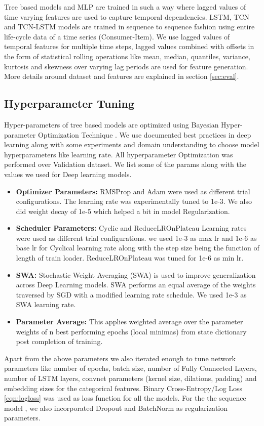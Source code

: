 Tree based models and MLP are trained in such a way where lagged values of time varying features are used
to capture temporal dependencies. LSTM, TCN and TCN-LSTM models are trained in sequence to sequence 
fashion \cite{sutskever2014sequence} using entire life-cycle data of a time series (Consumer-Item).
We use lagged values of temporal features for multiple time steps, lagged values combined with offsets in the form 
of statistical rolling operations like mean, median, quantiles, variance, 
kurtosis and skewness over varying lag periods are used for feature generation. More details around dataset and features 
are explained in section \ref{sec:eval}. 

\subsection{Hyperparameter Tuning}
Hyper-parameters of tree based models are optimized
using Bayesian Hyper-parameter Optimization Technique \cite{bergstra2013hyperopt}. We use documented best practices in deep 
learning along with some experiments and domain understanding to choose model hyperparameters like learning rate.
All hyperparameter Optimization was performed over Validation dataset. 
We list some of the params along with the values we used for Deep learning models.
  \begin{itemize}
    \item {\bf Optimizer Parameters:} RMSProp \cite{bengio2015rmsprop} and Adam were used as different trial configurations. The learning rate 
    was experimentally tuned to 1e-3. We also did weight decay of 1e-5 which helped a bit in model Regularization.
    \item {\bf Scheduler Parameters:} Cyclic \cite{smith2017cyclical} and ReduceLROnPlateau \cite{zaheer2018adaptive} 
    Learning rates were used as different trial configurations.
    we used 1e-3 as max lr and 1e-6 as base lr for Cyclical learning rate along with the step size being the function of
    length of train loader. ReduceLROnPlateau was tuned for 1e-6 as min lr.
    \item {\bf SWA:} Stochastic Weight Averaging (SWA) \cite{izmailov2018averaging} is used to improve generalization across Deep Learning
    models. SWA performs an equal average of the weights traversed by SGD with a modified learning rate schedule. We used 
    1e-3 as SWA learning rate.
    \item {\bf Parameter Average:} This applies weighted average over the parameter weights of n best performing epochs 
    (local minimas) from state dictionary post completion of training.
  \end{itemize}
Apart from the above parameters we also iterated enough to tune network parameters like number of epochs, batch size, 
number of Fully Connected Layers, number of LSTM layers, convnet parameters (kernel size, dilations, padding)
and embedding sizes for the categorical features. Binary Cross-Entropy/Log Loss \ref{eqn:logloss} was used as loss 
function for all the models. For the the sequence model \cite{sutskever2014sequence}, we also incorporated 
Dropout \cite{hinton2012improving} and BatchNorm \cite{santurkar2018does} as regularization parameters.

